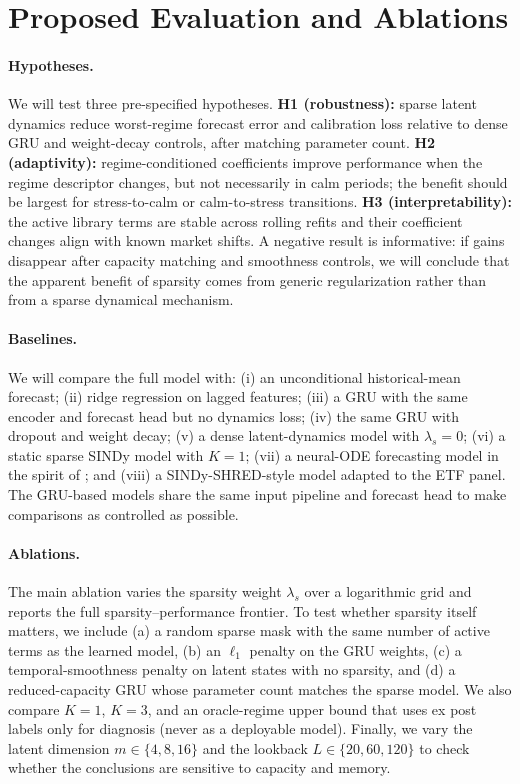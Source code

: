 \documentclass{article}
\begin{document}
\section{Proposed Evaluation and Ablations}

\paragraph{Hypotheses.}
We will test three pre-specified hypotheses. \textbf{H1 (robustness):} sparse latent dynamics reduce worst-regime forecast error and calibration loss relative to dense GRU and weight-decay controls, after matching parameter count. \textbf{H2 (adaptivity):} regime-conditioned coefficients improve performance when the regime descriptor changes, but not necessarily in calm periods; the benefit should be largest for stress-to-calm or calm-to-stress transitions. \textbf{H3 (interpretability):} the active library terms are stable across rolling refits and their coefficient changes align with known market shifts. A negative result is informative: if gains disappear after capacity matching and smoothness controls, we will conclude that the apparent benefit of sparsity comes from generic regularization rather than from a sparse dynamical mechanism.

\paragraph{Baselines.}
We will compare the full model with: (i) an unconditional historical-mean forecast; (ii) ridge regression on lagged features; (iii) a GRU with the same encoder and forecast head but no dynamics loss; (iv) the same GRU with dropout and weight decay; (v) a dense latent-dynamics model with $\lambda_s=0$; (vi) a static sparse SINDy model with $K=1$; (vii) a neural-ODE forecasting model in the spirit of \citet{nguyen2024}; and (viii) a SINDy-SHRED-style model adapted to the ETF panel. The GRU-based models share the same input pipeline and forecast head to make comparisons as controlled as possible.

\paragraph{Ablations.}
The main ablation varies the sparsity weight $\lambda_s$ over a logarithmic grid and reports the full sparsity--performance frontier. To test whether sparsity itself matters, we include (a) a random sparse mask with the same number of active terms as the learned model, (b) an $\ell_1$ penalty on the GRU weights, (c) a temporal-smoothness penalty on latent states with no sparsity, and (d) a reduced-capacity GRU whose parameter count matches the sparse model. We also compare $K=1$, $K=3$, and an oracle-regime upper bound that uses ex post labels only for diagnosis (never as a deployable model). Finally, we vary the latent dimension $m\in\{4,8,16\}$ and the lookback $L\in\{20,60,120\}$ to check whether the conclusions are sensitive to capacity and memory.
\end{document}
